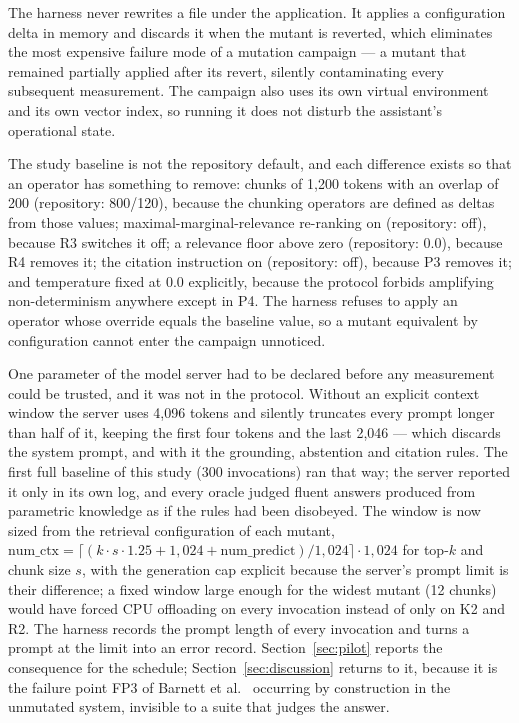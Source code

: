 \documentclass[a4paper,fleqn]{cas-dc}
\begin{document}
The harness never rewrites a file under the application. It applies a
configuration delta in memory and discards it when the mutant is reverted,
which eliminates the most expensive failure mode of a mutation campaign --- a
mutant that remained partially applied after its revert, silently contaminating
every subsequent measurement. The campaign also uses its own virtual
environment and its own vector index, so running it does not disturb the
assistant's operational state.

The study baseline is not the repository default, and each difference exists
so that an operator has something to remove: chunks of 1,200 tokens with an
overlap of 200 (repository: 800/120), because the chunking operators are
defined as deltas from those values; maximal-marginal-relevance re-ranking on
(repository: off), because R3 switches it off; a relevance floor above zero
(repository: 0.0), because R4 removes it; the citation instruction on
(repository: off), because P3 removes it; and temperature fixed at 0.0
explicitly, because the protocol forbids amplifying non-determinism anywhere
except in P4. The harness refuses to apply an operator whose override equals
the baseline value, so a mutant equivalent by configuration cannot enter the
campaign unnoticed.

One parameter of the model server had to be declared before any measurement
could be trusted, and it was not in the protocol. Without an explicit context
window the server uses 4,096 tokens and silently truncates every prompt longer
than half of it, keeping the first four tokens and the last 2,046 --- which
discards the system prompt, and with it the grounding, abstention and citation
rules. The first full baseline of this study (300 invocations) ran that way;
the server reported it only in its own log, and every oracle judged fluent
answers produced from parametric knowledge as if the rules had been
disobeyed. The window is now sized from the retrieval configuration of each
mutant, $\mathrm{num\_ctx} = \lceil (k \cdot s \cdot 1.25 + 1{,}024 +
\mathrm{num\_predict}) / 1{,}024 \rceil \cdot 1{,}024$ for top-$k$ and chunk
size $s$, with the generation cap explicit because the server's prompt limit
is their difference; a fixed window large enough for the widest mutant (12
chunks) would have forced CPU offloading on every invocation instead of only
on K2 and R2. The harness records the prompt length of every invocation and
turns a prompt at the limit into an error record. Section~\ref{sec:pilot}
reports the consequence for the schedule; Section~\ref{sec:discussion}
returns to it, because it is the failure point FP3 of Barnett et
al.~\cite{barnett2024seven} occurring by construction in the unmutated
system, invisible to a suite that judges the answer.
\end{document}
